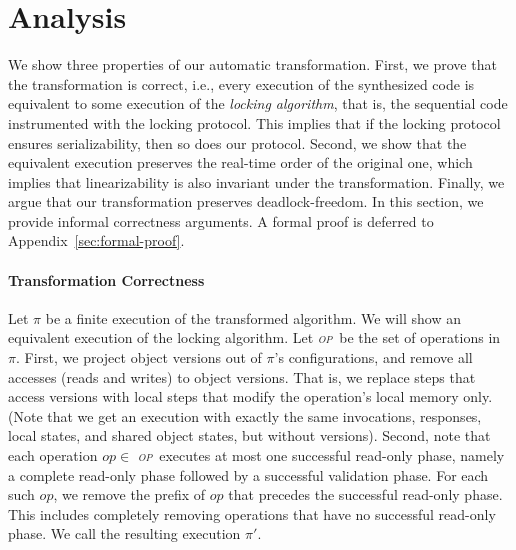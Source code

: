 \newcommand{\op}{\emph{\textsc{op}}}
\newcommand{\opt}{\textsc{opt}}

\section{Analysis}
\label{sec:proof}

We show  three properties of our automatic transformation. First, we prove that the  transformation is correct, i.e., 
every execution of the  synthesized code is equivalent to some execution of the \emph{locking algorithm}, that is, the
sequential code instrumented with the locking protocol.
This implies that if the locking protocol ensures serializability, then so does our protocol.
Second, we show that the equivalent execution preserves the real-time order of the original one, 
which implies that linearizability is also invariant under the transformation.
Finally, we argue that our transformation preserves deadlock-freedom.
In this section, we provide informal correctness arguments. A formal proof is deferred to Appendix~\ref{sec:formal-proof}.

\paragraph{Transformation Correctness}

Let $\pi$ be a finite execution of the transformed algorithm. We will show an equivalent execution of the locking algorithm.
Let \op\ be the set of operations in $\pi$.
First, we project object versions out of $\pi$'s configurations, and remove all accesses (reads and writes) to object versions.
That is, we replace steps that access versions with local steps that modify the operation's local memory only.
(Note that we get an execution with exactly the same invocations, responses, local states, and shared object states, but without 
versions). 
Second, note that each operation $op \in$ \op\ executes at most one successful read-only
phase, namely a complete read-only phase followed by a successful validation phase.
For each such $op$, we remove the prefix of $op$ that precedes the successful read-only phase.
This includes completely removing operations that have no successful read-only phase.
We call the resulting execution $\pi'$.

